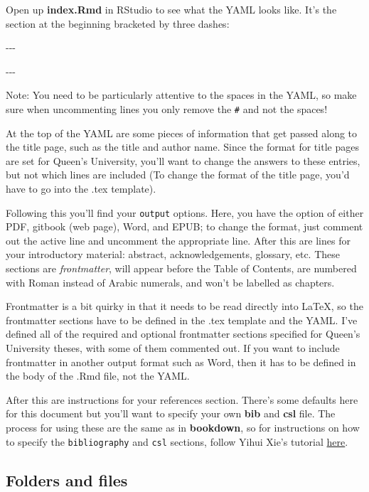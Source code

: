 \documentclass[12pt, oneside]{queensuthesis}
\numberwithin{equation}{chapter}       %
\newenvironment{Shaded}{\begin{snugshade}}{\end{snugshade}}
\newcommand{\SpecialCharTok}[1]{\textcolor[rgb]{0.00,0.00,0.00}{#1}}
\begin{document}
Open up \textbf{index.Rmd} in RStudio to see what the YAML looks like. It's the section at the beginning bracketed by three dashes:
\begin{Shaded}
\begin{Highlighting}[]
\SpecialCharTok{{-}{-}{-}}

\SpecialCharTok{{-}{-}{-}}
\end{Highlighting}
\end{Shaded}
Note: You need to be particularly attentive to the spaces in the YAML, so make sure when uncommenting lines you only remove the \texttt{\#} and not the spaces!

At the top of the YAML are some pieces of information that get passed along to the title page, such as the title and author name. Since the format for title pages are set for Queen's University, you'll want to change the answers to these entries, but not which lines are included (To change the format of the title page, you'd have to go into the .tex template).

Following this you'll find your \texttt{output} options. Here, you have the option of either PDF, gitbook (web page), Word, and EPUB; to change the format, just comment out the active line and uncomment the appropriate line. After this are lines for your introductory material: abstract, acknowledgements, glossary, etc. These sections are \emph{frontmatter}, will appear before the Table of Contents, are numbered with Roman instead of Arabic numerals, and won't be labelled as chapters.

Frontmatter is a bit quirky in that it needs to be read directly into LaTeX, so the frontmatter sections have to be defined in the .tex template and the YAML. I've defined all of the required and optional frontmatter sections specified for Queen's University theses, with some of them commented out. If you want to include frontmatter in another output format such as Word, then it has to be defined in the body of the .Rmd file, not the YAML.

After this are instructions for your references section. There's some defaults here for this document but you'll want to specify your own \textbf{bib} and \textbf{csl} file. The process for using these are the same as in \textbf{bookdown}, so for instructions on how to specify the \texttt{bibliography} and \texttt{csl} sections, follow Yihui Xie's tutorial \href{https://bookdown.org/yihui/rmarkdown-cookbook/bibliography.html}{here}.

\hypertarget{folders-and-files}{%
\subsection{Folders and files}\label{folders-and-files}}
\end{document}
